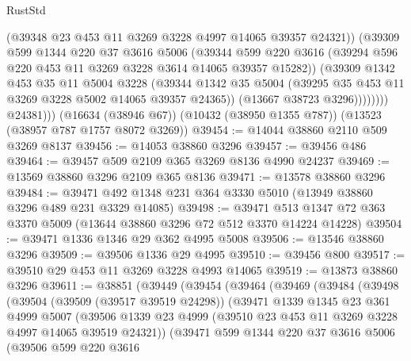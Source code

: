 \begin{lexlean}{RustStd}
\begin{coremodule}
                      (@39348 @23 @453 @11 @3269 @3228 @4997 @14065 @39357 @24321))
                    (@39309
                      @599
                      @1344
                      @220
                      @37
                      @3616
                      @5006
                      (@39344
                        @599
                        @220
                        @3616
                        (@39294 @596 @220 @453 @11 @3269 @3228 @3614 @14065 @39357 @15282))
                      (@39309
                        @1342
                        @453
                        @35
                        @11
                        @5004
                        @3228
                        (@39344
                          @1342
                          @35
                          @5004
                          (@39295 @35 @453 @11 @3269 @3228 @5002 @14065 @39357 @24365))
                        (@13667 @38723 @3296))))))))
          @24381)))
    (@16634 (@38946 @67))
    (@10432 (@38950 @1355 @787))
    (@13523 (@38957 @787 @1757 @8072 @3269))
@39454 := @14044 @38860 @2110 @509 @3269 @8137
@39456 := @14053 @38860 @3296
@39457 := @39456 @486
@39464 := @39457 @509 @2109 @365 @3269 @8136 @4990 @24237
@39469 := @13569 @38860 @3296 @2109 @365 @8136
@39471 := @13578 @38860 @3296
@39484 := @39471 @492 @1348 @231 @364 @3330 @5010 (@13949 @38860 @3296 @489 @231 @3329 @14085)
@39498 := @39471 @513 @1347 @72 @363 @3370 @5009 (@13644 @38860 @3296 @72 @512 @3370 @14224 @14228)
@39504 := @39471 @1336 @1346 @29 @362 @4995 @5008
@39506 := @13546 @38860 @3296
@39509 := @39506 @1336 @29 @4995
@39510 := @39456 @800
@39517 := @39510 @29 @453 @11 @3269 @3228 @4993 @14065
@39519 := @13873 @38860 @3296
@39611 := @38851
    (@39449
      (@39454
        (@39464
          (@39469
            (@39484
              (@39498
                (@39504
                  (@39509 (@39517 @39519 @24298))
                  (@39471
                    @1339
                    @1345
                    @23
                    @361
                    @4999
                    @5007
                    (@39506
                      @1339
                      @23
                      @4999
                      (@39510 @23 @453 @11 @3269 @3228 @4997 @14065 @39519 @24321))
                    (@39471
                      @599
                      @1344
                      @220
                      @37
                      @3616
                      @5006
                      (@39506
                        @599
                        @220
                        @3616

\end{coremodule}
\end{lexlean}
